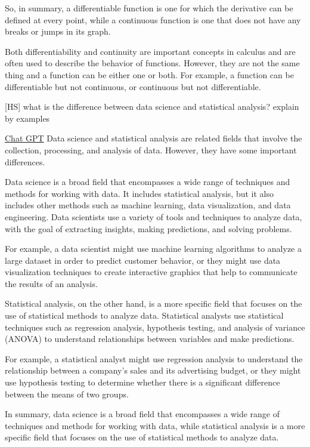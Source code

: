 \documentclass[
]{book}
\theoremstyle{definition}
\theoremstyle{definition}
\theoremstyle{definition}
\theoremstyle{definition}
\theoremstyle{remark}
\begin{document}
So, in summary, a differentiable function is one for which the derivative can be defined at every point, while a continuous function is one that does not have any breaks or jumps in its graph.

Both differentiability and continuity are important concepts in calculus and are often used to describe the behavior of functions. However, they are not the same thing and a function can be either one or both. For example, a function can be differentiable but not continuous, or continuous but not differentiable.

{[}HS{]} what is the difference between data science and statistical analysis? explain by examples

\protect\hyperlink{chatgpt}{Chat GPT} Data science and statistical analysis are related fields that involve the collection, processing, and analysis of data. However, they have some important differences.

Data science is a broad field that encompasses a wide range of techniques and methods for working with data. It includes statistical analysis, but it also includes other methods such as machine learning, data visualization, and data engineering. Data scientists use a variety of tools and techniques to analyze data, with the goal of extracting insights, making predictions, and solving problems.

For example, a data scientist might use machine learning algorithms to analyze a large dataset in order to predict customer behavior, or they might use data visualization techniques to create interactive graphics that help to communicate the results of an analysis.

Statistical analysis, on the other hand, is a more specific field that focuses on the use of statistical methods to analyze data. Statistical analysts use statistical techniques such as regression analysis, hypothesis testing, and analysis of variance (ANOVA) to understand relationships between variables and make predictions.

For example, a statistical analyst might use regression analysis to understand the relationship between a company's sales and its advertising budget, or they might use hypothesis testing to determine whether there is a significant difference between the means of two groups.

In summary, data science is a broad field that encompasses a wide range of techniques and methods for working with data, while statistical analysis is a more specific field that focuses on the use of statistical methods to analyze data.
\end{document}
